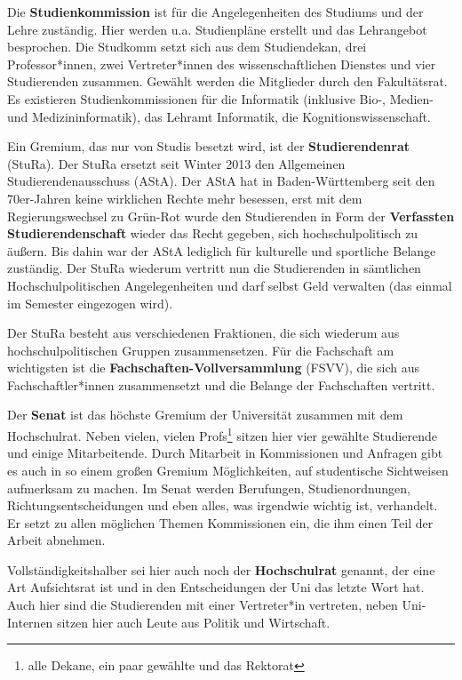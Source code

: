 Die \textbf{Studienkommission} ist für die Angelegenheiten des Studiums und der
Lehre zuständig. Hier werden u.a. Studienpläne erstellt und das Lehrangebot
besprochen. Die Studkomm setzt sich aus dem Studiendekan, drei Professor*innen,
zwei Vertreter*innen des wissenschaftlichen Dienstes und vier Studierenden zusammen.
Gewählt werden die Mitglieder durch den Fakultätsrat. Es existieren Studienkommissionen
f\"ur die Informatik (inklusive Bio-, Medien- und Medizininformatik),
das Lehramt Informatik, die Kognitionswissenschaft.

Ein Gremium, das nur von Studis besetzt wird, ist der \textbf{Studierendenrat} (StuRa).
Der StuRa ersetzt seit Winter 2013 den Allgemeinen Studierendenausschuss (AStA).
Der AStA hat in Baden-W\"urttemberg seit den 70er-Jahren keine wirklichen
Rechte mehr besessen, erst mit dem Regierungswechsel zu Gr\"un-Rot wurde den
Studierenden in Form der \textbf{Verfassten Studierendenschaft} wieder das Recht
gegeben, sich hochschulpolitisch zu äußern. Bis dahin war der AStA
lediglich f\"ur kulturelle und sportliche Belange zust\"andig. Der StuRa wiederum
vertritt nun die Studierenden in s\"amtlichen Hochschulpolitischen Angelegenheiten
und darf selbst Geld verwalten (das einmal im Semester eingezogen wird).

Der StuRa besteht aus verschiedenen Fraktionen, die sich wiederum aus
hochschulpolitischen Gruppen zusammensetzen. F\"ur die Fachschaft am wichtigsten
ist die \textbf{Fachschaften-Vollversammlung} (FSVV), die sich aus Fachschaftler*innen zusammensetzt und die Belange der Fachschaften vertritt.

Der \textbf{Senat} ist das höchste Gremium der Universität zusammen mit
  dem Hochschulrat.  Neben vielen, vielen Profs\footnote{alle Dekane, ein
  paar gewählte und das Rektorat} sitzen hier vier gewählte Studierende und
  einige Mitarbeitende.  Durch Mitarbeit in Kommissionen und Anfragen gibt es
  auch in so einem großen Gremium Möglichkeiten, auf studentische Sichtweisen
aufmerksam zu machen.  Im
  Senat werden Berufungen, Studienordnungen, Richtungsentscheidungen und
  eben alles, was irgendwie wichtig ist, verhandelt.  Er setzt zu allen
  möglichen Themen Kommissionen ein, die ihm einen Teil der Arbeit
  abnehmen.


Vollständigkeitshalber sei hier auch noch der \textbf{Hochschulrat}
  genannt, der eine Art Aufsichtsrat ist und in den Entscheidungen der
  Uni das letzte Wort hat. Auch hier sind die Studierenden mit einer
  Vertreter*in vertreten, neben Uni-Internen sitzen hier auch Leute aus
  Politik und Wirtschaft.


